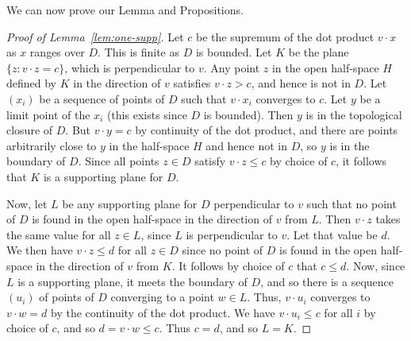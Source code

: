 We can now prove our Lemma and Propositions.

\begin{proof}[Proof of Lemma~\ref{lem:one-supp}]
Let $c$ be the supremum of the dot product $v\cdot x$ as $x$ ranges over $D$. This is finite as $D$ is bounded. Let 
$K$ be the plane $\{ z : v\cdot z = c \}$, which is perpendicular to $v$. Any point $z$ in the open half-space $H$ defined by $K$ in the direction of $v$ satisfies $v\cdot z > c$, and hence is not in $D$. Let $(x_i)$ be a sequence of points of $D$ such that $v\cdot x_i$ converges to $c$. Let $y$ be a limit point of the $x_i$ (this exists since $D$ is bounded). Then $y$ is in the topological closure of $D$. But $v\cdot y = c$ by continuity of the dot product, and there are points arbitrarily close to $y$ in the half-space $H$ and hence not in $D$, so $y$ is in the boundary of $D$. Since all points $z\in D$ satisfy $v\cdot z \le c$ by choice of $c$, it follows that $K$ is a supporting plane for $D$.
 
Now, let $L$ be any supporting plane for $D$ perpendicular to $v$ such that no point of $D$ is found in the open half-space in the direction of $v$ from $L$. Then $v\cdot z$ takes the same value for all $z \in L$, since $L$ is perpendicular to $v$. Let that value be $d$. We then have $v\cdot z \le d$ for all $z\in D$ since no point of $D$ is found in the open half-space in the direction of $v$ from $K$. It follows by choice of $c$ that $c \le d$. Now, since $L$ is a supporting plane, it meets the boundary of $D$, and so there is a sequence $(u_i)$ of points of $D$ converging to a point $w\in L$. Thus, $v\cdot u_i$ converges to $v\cdot w = d$ by  the continuity of the dot product. We have $v\cdot u_i \le c$ for all $i$ by choice of $c$, and so $d = v\cdot w \le c$.
Thus $c = d$, and so $L = K$.
\end{proof}

